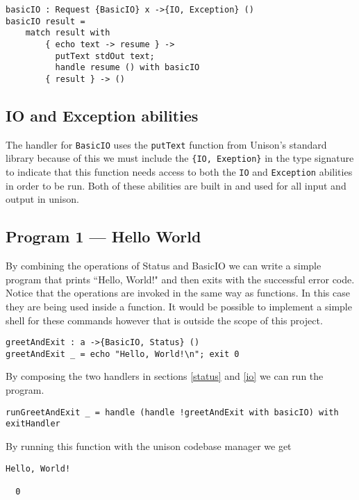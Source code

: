 \documentclass[logo,bsc,singlespacing,parskip]{infthesis}
\begin{document}
\begin{lstlisting}[language=unison]
basicIO : Request {BasicIO} x ->{IO, Exception} ()
basicIO result =
    match result with
        { echo text -> resume } -> 
          putText stdOut text; 
          handle resume () with basicIO
        { result } -> ()
\end{lstlisting}

\subsection{IO and Exception abilities}

The handler for \texttt{BasicIO} uses the \texttt{putText} function from
Unison's standard library because of this we must include the \texttt{\{IO,
Exeption\}} in the type signature to indicate that this function needs access
to both the \texttt{IO} and \texttt{Exception} abilities in order to be run.
Both of these abilities are built in and used for all input and output in
unison.

\begin{tcolorbox}[colback=gray!10, colframe=black, arc=0pt, outer arc=0pt]

\section*{Program 1 --- Hello World}
\label{prog:helloworld}

By combining the operations of Status and BasicIO we can write a simple program that prints ``Hello, World!" and then exits with the successful error code. Notice that the operations are invoked in the same way as functions. In this case they are being used inside a function. It would be possible to implement a simple shell for these commands however that is outside the scope of this project.

\begin{lstlisting}[language=unison]
greetAndExit : a ->{BasicIO, Status} ()
greetAndExit _ = echo "Hello, World!\n"; exit 0
\end{lstlisting}

By composing the two handlers in sections \ref{status} and \ref{io} we can run the program.

\begin{lstlisting}[language=unison]
runGreetAndExit _ = handle (handle !greetAndExit with basicIO) with exitHandler
\end{lstlisting}

By running this function with the unison codebase manager we get

\begin{lstlisting}[style=terminal]
Hello, World!

  0
\end{lstlisting}
\end{tcolorbox}
\end{document}
